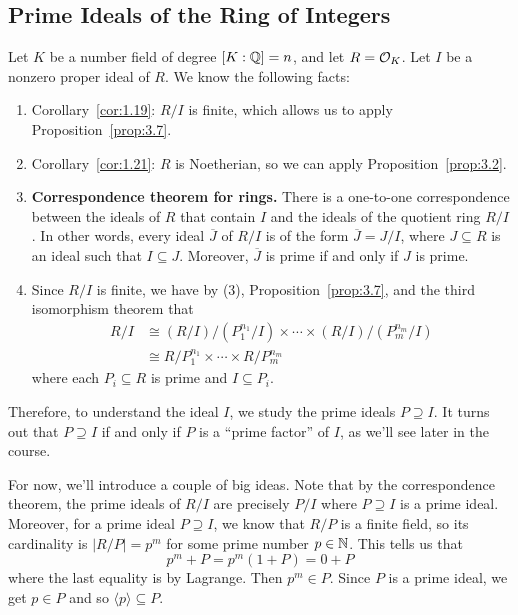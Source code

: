 \subsection{Prime Ideals of the Ring of Integers} \label{subsec:3.2}
Let $K$ be a number field of degree $[K : \mathbb{Q}] = n$, and let $R = {\cal O}_K$.
Let $I$ be a nonzero proper ideal of $R$. We know the following facts: 
\begin{enumerate}[(1)]
    \item Corollary~\ref{cor:1.19}: $R/I$ is finite, which allows us to 
    apply Proposition~\ref{prop:3.7}.
    \item Corollary~\ref{cor:1.21}: $R$ is Noetherian, so we can apply 
    Proposition~\ref{prop:3.2}.
    \item {\bf Correspondence theorem for rings.} There is a one-to-one
    correspondence between the ideals of $R$ that contain $I$ and the 
    ideals of the quotient ring $R/I$. In other words, every ideal $\overline{J}$ 
    of $R/I$ is of the form $\overline{J} = J/I$, where $J \subseteq R$ 
    is an ideal such that $I \subseteq J$. Moreover, $\overline{J}$ 
    is prime if and only if $J$ is prime. 
    \item Since $R/I$ is finite, we have by (3), Proposition~\ref{prop:3.7},
    and the third isomorphism theorem that 
    \begin{align*}
        R/I &\cong (R/I)/(P_1^{n_1}/I) \times \cdots \times (R/I)/(P_m^{n_m}/I) \\ 
        &\cong R/P_1^{n_1} \times \cdots \times R/P_m^{n_m} 
    \end{align*}
    where each $P_i \subseteq R$ is prime and $I \subseteq P_i$. 
\end{enumerate}
Therefore, to understand the ideal $I$, we study the prime ideals $P \supseteq I$. 
It turns out that $P \supseteq I$ if and only if $P$ is a ``prime factor'' of $I$,
as we'll see later in the course. 

For now, we'll introduce a couple of big ideas. Note that by the correspondence 
theorem, the prime ideals of $R/I$ are precisely $P/I$ where $P \supseteq I$ 
is a prime ideal. Moreover, for a prime ideal $P \supseteq I$, we know that 
$R/P$ is a finite field, so its cardinality is $|R/P| = p^m$
for some prime number $p \in \mathbb{N}$. This tells us that 
\[ p^m + P = p^m(1 + P) = 0 + P \] 
where the last equality is by Lagrange. Then $p^m \in P$. Since $P$ 
is a prime ideal, we get $p \in P$ and so $\langle p \rangle \subseteq P$. 

